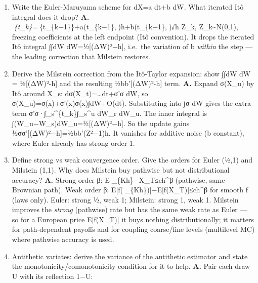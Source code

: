 \documentclass[
  11pt,
]{article}
\begin{document}
\begin{enumerate}
  (log N)\^{}d factor is enormous for large d, so the QMC advantage only
  shows at impractical N unless the \emph{effective} dimension (how much
  each coordinate actually matters) is low --- Brownian-bridge / PCA
  path constructions lower it and make QMC work for option pricing.
  Plain QMC is deterministic, giving no error estimate; randomised QMC
  (e.g.~random shifts of a lattice rule) restores an unbiased estimator
  and lets you estimate the error from independent shifts while keeping
  most of the discrepancy gain.
\item
  Write the Euler-Maruyama scheme for dX=a dt+b dW. What iterated Itô
  integral does it drop? \textbf{A.}
  \emph{\{t\_k\}=}\{t\_\{k−1\}\}+a(t\_\{k−1\},)h+b(t\_\{k−1\},)√h
  Z\_k, Z\_k\textasciitilde N(0,1), freezing coefficients at the left
  endpoint (Itô convention). It drops the iterated Itô integral ∫∫dW
  dW=½{[}(ΔW)²−h{]}, i.e.~the variation of b \emph{within} the step ---
  the leading correction that Milstein restores.
\item
  Derive the Milstein correction from the Itô-Taylor expansion: show
  ∫∫dW dW = ½{[}(ΔW)²-h{]} and the resulting ½bb'{[}(ΔW)²-h{]} term.
  \textbf{A.} Expand σ(X\_u) by Itô around X\_s: dσ(X\_t)=\ldots dt+σ'σ
  dW, so σ(X\_u)=σ(x)+σ'(x)σ(x)∫dW+O(dt). Substituting into ∫σ dW gives
  the extra term σ'σ·∫\_s\^{}\{t\_k\}∫\_s\^{}u dW\_r dW\_u. The inner
  integral is ∫(W\_u−W\_s)dW\_u=½{[}(ΔW)²−h{]}. So the update gains
  ½σσ'{[}(ΔW)²−h{]}=½bb'(Z²−1)h. It vanishes for additive noise (b
  constant), where Euler already has strong order 1.
\item
  Define strong vs weak convergence order. Give the orders for Euler
  (½,1) and Milstein (1,1). Why does Milstein buy pathwise but not
  distributional accuracy? \textbf{A.} Strong order β:
  E\textbar\_\{Kh\}−X\_T\textbar≤ch\^{}β (pathwise, same Brownian
  path). Weak order β:
  \textbar E{[}f(\_\{Kh\}){]}−E{[}f(X\_T){]}\textbar≤ch\^{}β for smooth
  f (laws only). Euler: strong ½, weak 1; Milstein: strong 1, weak 1.
  Milstein improves the \emph{strong} (pathwise) rate but has the same
  weak rate as Euler --- so for a European price E{[}f(X\_T){]} it buys
  nothing distributionally; it matters for path-dependent payoffs and
  for coupling coarse/fine levels (multilevel MC) where pathwise
  accuracy is used.
\item
  Antithetic variates: derive the variance of the antithetic estimator
  and state the monotonicity/comonotonicity condition for it to help.
  \textbf{A.} Pair each draw U with its reflection 1−U:

\end{enumerate}
\end{document}
